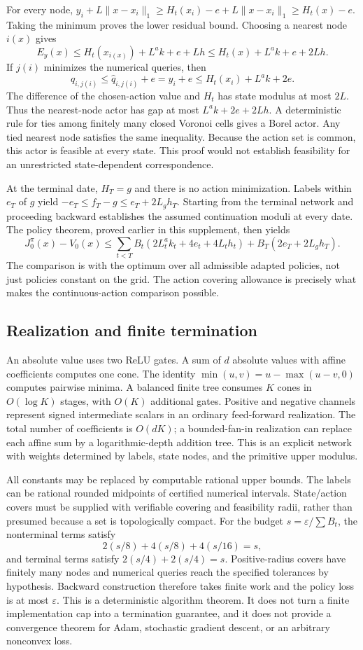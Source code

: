 For every node, $y_i+L\|x-x_i\|_1\ge H_t(x_i)-e+L\|x-x_i\|_1\ge H_t(x)-e$. Taking the minimum proves the lower residual bound. Choosing a nearest node $i(x)$ gives
\[
 E_y(x)\le H_t(x_{i(x)})+L^ak+e+Lh
        \le H_t(x)+L^ak+e+2Lh.
\]
If $j(i)$ minimizes the numerical queries, then
\[
 q_{i,j(i)}\le\widehat q_{i,j(i)}+e=y_i+e
       \le H_t(x_i)+L^ak+2e.
\]
The difference of the chosen-action value and $H_t$ has state modulus at most $2L$. Thus the nearest-node actor has gap at most $L^ak+2e+2Lh$. A deterministic rule for ties among finitely many closed Voronoi cells gives a Borel actor. Any tied nearest node satisfies the same inequality. Because the action set is common, this actor is feasible at every state. This proof would not establish feasibility for an unrestricted state-dependent correspondence.

At the terminal date, $H_T=g$ and there is no action minimization. Labels within $e_T$ of $g$ yield $-e_T\le f_T-g\le e_T+2L_gh_T$. Starting from the terminal network and proceeding backward establishes the assumed continuation moduli at every date. The policy theorem, proved earlier in this supplement, then yields
\[
 J_0^\pi(x)-V_0(x)\le
 \sum_{t<T}B_t(2L^a_tk_t+4e_t+4L_th_t)
   +B_T(2e_T+2L_gh_T).
\]
The comparison is with the optimum over all admissible adapted policies, not just policies constant on the grid. The action covering allowance is precisely what makes the continuous-action comparison possible.

\subsection{Realization and finite termination}
An absolute value uses two ReLU gates. A sum of $d$ absolute values with affine coefficients computes one cone. The identity $\min(u,v)=u-\max(u-v,0)$ computes pairwise minima. A balanced finite tree consumes $K$ cones in $O(\log K)$ stages, with $O(K)$ additional gates. Positive and negative channels represent signed intermediate scalars in an ordinary feed-forward realization. The total number of coefficients is $O(dK)$; a bounded-fan-in realization can replace each affine sum by a logarithmic-depth addition tree. This is an explicit network with weights determined by labels, state nodes, and the primitive upper modulus.

All constants may be replaced by computable rational upper bounds. The labels can be rational rounded midpoints of certified numerical intervals. State/action covers must be supplied with verifiable covering and feasibility radii, rather than presumed because a set is topologically compact. For the budget $s=\varepsilon/\sum B_t$, the nonterminal terms satisfy
\[
 2(s/8)+4(s/8)+4(s/16)=s,
\]
and terminal terms satisfy $2(s/4)+2(s/4)=s$. Positive-radius covers have finitely many nodes and numerical queries reach the specified tolerances by hypothesis. Backward construction therefore takes finite work and the policy loss is at most $\varepsilon$. This is a deterministic algorithm theorem. It does not turn a finite implementation cap into a termination guarantee, and it does not provide a convergence theorem for Adam, stochastic gradient descent, or an arbitrary nonconvex loss.

